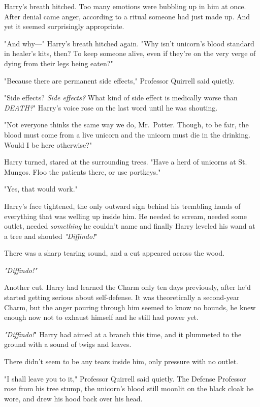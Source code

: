 Harry's breath hitched. Too many emotions were bubbling up in him at once. 
After denial came anger, according to a ritual someone had just made up. And 
yet it seemed surprisingly appropriate.

"And why---" Harry's breath hitched again. "Why isn't unicorn's blood standard 
in healer's kits, then? To keep someone alive, even if they're on the very 
verge of dying from their legs being eaten?"

"Because there are permanent side effects," Professor Quirrell said quietly.

"Side effects? \emph{Side effects?} What kind of side effect is medically worse 
than \emph{DEATH?}" Harry's voice rose on the last word until he was shouting.

"Not everyone thinks the same way we do, Mr.~Potter. Though, to be fair, the 
blood must come from a live unicorn and the unicorn must die in the drinking. 
Would I be here otherwise?"

Harry turned, stared at the surrounding trees. "Have a herd of unicorns at St. 
Mungos. Floo the patients there, or use portkeys."

"Yes, that would work."

Harry's face tightened, the only outward sign behind his trembling hands of 
everything that was welling up inside him. He needed to scream, needed some 
outlet, needed \emph{something} he couldn't name and finally Harry leveled his 
wand at a tree and shouted \emph{"Diffindo!}"

There was a sharp tearing sound, and a cut appeared across the wood.

\emph{"Diffindo!"}

Another cut. Harry had learned the Charm only ten days previously, after he'd 
started getting serious about self-defense. It was theoretically a second-year 
Charm, but the anger pouring through him seemed to know no bounds, he knew 
enough now not to exhaust himself and he still had power yet.

\emph{"Diffindo!}" Harry had aimed at a branch this time, and it plummeted to 
the ground with a sound of twigs and leaves.

There didn't seem to be any tears inside him, only pressure with no outlet.

"I shall leave you to it," Professor Quirrell said quietly. The Defense 
Professor rose from his tree stump, the unicorn's blood still moonlit on the 
black cloak he wore, and drew his hood back over his head.